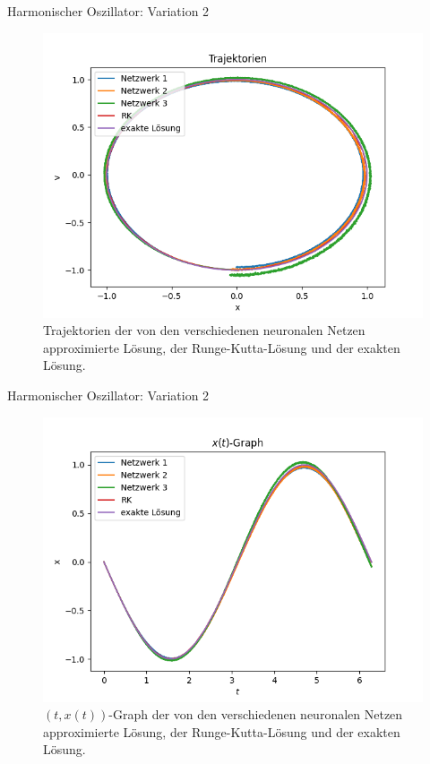 \begin{frame}{Harmonischer Oszillator: Variation 2}
    \begin{figure}
        \centering
        \includegraphics[scale=0.5]{images/harmonicoscillator_plots/harmonicoscillator_layers_vartrajectories}
        \caption{Trajektorien der von den verschiedenen neuronalen Netzen approximierte Lösung, der Runge-Kutta-Lösung
        und der exakten Lösung.}
        \label{fig:harmonic-layers-variable-trajectories}
    \end{figure}
\end{frame}

\begin{frame}{Harmonischer Oszillator: Variation 2}
    \begin{figure}
        \centering
        \includegraphics[scale=0.5]{images/harmonicoscillator_plots/harmonicoscillator_layers_vartrajectories_in_time_}
        \caption{$(t,x(t))$-Graph der von den verschiedenen neuronalen Netzen approximierte Lösung, der
        Runge-Kutta-Lösung und der exakten Lösung.}
        \label{fig:harmonic-layers-variable-trajectories-in-time}
    \end{figure}
\end{frame}